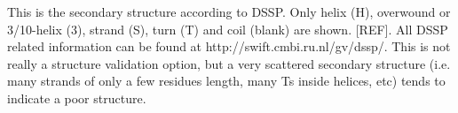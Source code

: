 \begin{note}


\parbox{1\textwidth}{
}%


\parbox{1\textwidth}{
}%

\end{note}

\begin{note}
This is the secondary structure according to DSSP. Only helix (H),
overwound or 3/10-helix (3), strand (S), turn (T) and coil (blank)
are shown. [REF]. All DSSP related information can be found at
http://swift.cmbi.ru.nl/gv/dssp/.
This is not really a structure validation option, but a very scattered
secondary structure (i.e. many strands of only a few residues length,
many Ts inside helices, etc) tends to indicate a poor structure.



\end{note}
